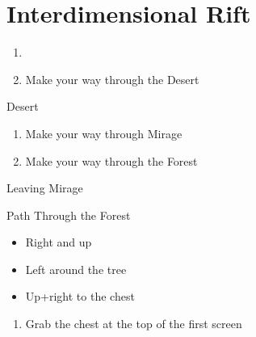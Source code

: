 \chapter{Interdimensional Rift}

\vspace{\baselineskip}

\begin{paracol}{2}

\begin{enumerate}
    \item {}
    \item Make your way through the Desert
\end{enumerate}

\switchcolumn
\begin{steproute}{Desert}
\end{steproute}

\switchcolumn*
\begin{enumerate}[resume]
    \item Make your way through Mirage
    \item Make your way through the Forest
\end{enumerate}

\switchcolumn
\begin{steproute}{Leaving Mirage}
\end{steproute}

\switchcolumn
\begin{misc}{Path Through the Forest}
    \begin{itemize}
        \item Right and up
        \item Left around the tree
        \item Up+right to the chest
    \end{itemize}
\end{misc}

\begin{enumerate}[resume]
    \item Grab the  chest at the top of the first screen
\end{enumerate}


\end{paracol}
